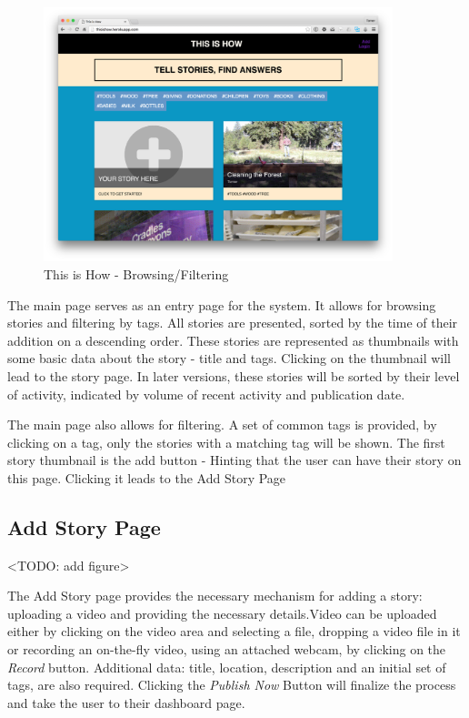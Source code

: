    \begin{figure}[thpb]
      \centering
      \includegraphics[width=4in]{figures/mainpage.png}
      \caption{This is How - Browsing/Filtering}
      \label{fig_main_page}
   \end{figure}

The main page serves as an entry page for the system. It allows for browsing stories and filtering by tags. All stories are presented, sorted by the time of their addition on a descending order. These stories are represented as thumbnails with some basic data about the story - title and tags. Clicking on the thumbnail will lead to the story page. In later versions, these stories will be sorted by their level of activity, indicated by volume of recent activity and publication date. 

The main page also allows for filtering. A set of common tags is provided, by clicking on a tag, only the stories with a matching tag will be shown. The first story thumbnail is the add button - Hinting that the user can have their story on this page. Clicking it leads to the Add Story Page

\subsection{Add Story Page}

<TODO: add figure>

The Add Story page provides the necessary mechanism for adding a story: uploading a video and providing the necessary details.Video can be uploaded either by clicking on the video area and selecting a file, dropping a video file in it or recording an on-the-fly video, using an attached webcam, by clicking on the \textit{Record} button. Additional data: title, location, description and an initial set of tags, are also required. Clicking the \textit{Publish Now} Button will finalize the process and take the user to their dashboard page. 

